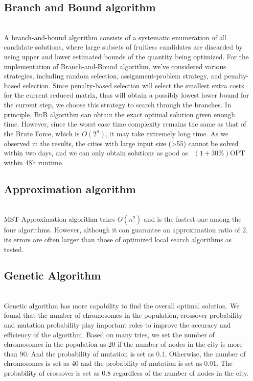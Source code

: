 \subsection{Branch and Bound algorithm}
\hfill\\
A branch-and-bound algorithm consists of a systematic enumeration of all candidate solutions, where large subsets of fruitless candidates are discarded by using upper and lower estimated bounds of the quantity being optimized. For the implementation of Branch-and-Bound algorithm, we’ve considered various strategies, including random selection, assignment-problem strategy, and penalty-based selection. Since penalty-based selection will select the smallest extra costs for the current reduced matrix, thus will obtain a possibly lowest lower bound for the current step, we choose this strategy to search through the branches. In principle, BnB algorithm can obtain the exact optimal solution given enough time. However, since the worst case time complexity remains the same as that of the Brute Force, which is $O(2^n)$, it may take extremely long time. As we observed in the results, the cities with large input size (>55) cannot be solved within two days, and we can only obtain solutions as good as ~$(1+30\%)$OPT within 48h runtime.
\subsection{Approximation algorithm}
\hfill\\
MST-Approximation algorithm takes $O(n^2)$ and is the fastest one among the four algorithms. However, although it can guarantee an approximation ratio of 2, its errors are often larger than those of optimized local search algorithms as tested.

\subsection{Genetic Algorithm}
\hfill\\
Genetic algorithm has more capability to find the overall optimal solution. We found that the number of chromosomes in the population, crossover probability and mutation probability play important roles to improve the accuracy and efficiency of the algorithm. Based on many tries, we set the number of chromosomes in the population as 20 if the number of nodes in the city is more than 90. And the probability of mutation is set as 0.1. Otherwise, the number of chromosomes is set as 40 and the probability of mutation is set as 0.01. The probability of crossover is set as 0.8 regardless of the number of nodes in the city.


